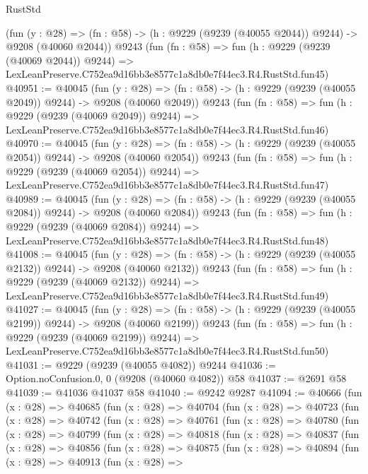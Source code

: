 \begin{lexlean}{RustStd}
\begin{coremodule}
    (fun (y : @28) =>
    (fn : @58) -> (h : @9229 (@9239 (@40055 @2044)) @9244) -> @9208 (@40060 @2044))
    @9243
    (fun (fn : @58) =>
    fun (h : @9229 (@9239 (@40069 @2044)) @9244) =>
    LexLeanPreserve.C752ea9d16bb3e8577c1a8db0e7f44ec3.R4.RustStd.fun45)
@40951 := @40045
    (fun (y : @28) =>
    (fn : @58) -> (h : @9229 (@9239 (@40055 @2049)) @9244) -> @9208 (@40060 @2049))
    @9243
    (fun (fn : @58) =>
    fun (h : @9229 (@9239 (@40069 @2049)) @9244) =>
    LexLeanPreserve.C752ea9d16bb3e8577c1a8db0e7f44ec3.R4.RustStd.fun46)
@40970 := @40045
    (fun (y : @28) =>
    (fn : @58) -> (h : @9229 (@9239 (@40055 @2054)) @9244) -> @9208 (@40060 @2054))
    @9243
    (fun (fn : @58) =>
    fun (h : @9229 (@9239 (@40069 @2054)) @9244) =>
    LexLeanPreserve.C752ea9d16bb3e8577c1a8db0e7f44ec3.R4.RustStd.fun47)
@40989 := @40045
    (fun (y : @28) =>
    (fn : @58) -> (h : @9229 (@9239 (@40055 @2084)) @9244) -> @9208 (@40060 @2084))
    @9243
    (fun (fn : @58) =>
    fun (h : @9229 (@9239 (@40069 @2084)) @9244) =>
    LexLeanPreserve.C752ea9d16bb3e8577c1a8db0e7f44ec3.R4.RustStd.fun48)
@41008 := @40045
    (fun (y : @28) =>
    (fn : @58) -> (h : @9229 (@9239 (@40055 @2132)) @9244) -> @9208 (@40060 @2132))
    @9243
    (fun (fn : @58) =>
    fun (h : @9229 (@9239 (@40069 @2132)) @9244) =>
    LexLeanPreserve.C752ea9d16bb3e8577c1a8db0e7f44ec3.R4.RustStd.fun49)
@41027 := @40045
    (fun (y : @28) =>
    (fn : @58) -> (h : @9229 (@9239 (@40055 @2199)) @9244) -> @9208 (@40060 @2199))
    @9243
    (fun (fn : @58) =>
    fun (h : @9229 (@9239 (@40069 @2199)) @9244) =>
    LexLeanPreserve.C752ea9d16bb3e8577c1a8db0e7f44ec3.R4.RustStd.fun50)
@41031 := @9229 (@9239 (@40055 @4082)) @9244
@41036 := Option.noConfusion.{0, 0} (@9208 (@40060 @4082)) @58
@41037 := @2691 @58
@41039 := @41036 @41037 @58
@41040 := @9242 @9287
@41094 := @40666
    (fun (x : @28) =>
    @40685
      (fun (x : @28) =>
      @40704
        (fun (x : @28) =>
        @40723
          (fun (x : @28) =>
          @40742
            (fun (x : @28) =>
            @40761
              (fun (x : @28) =>
              @40780
                (fun (x : @28) =>
                @40799
                  (fun (x : @28) =>
                  @40818
                    (fun (x : @28) =>
                    @40837
                      (fun (x : @28) =>
                      @40856
                        (fun (x : @28) =>
                        @40875
                          (fun (x : @28) =>
                          @40894
                            (fun (x : @28) =>
                            @40913
                              (fun (x : @28) =>

\end{coremodule}
\end{lexlean}
